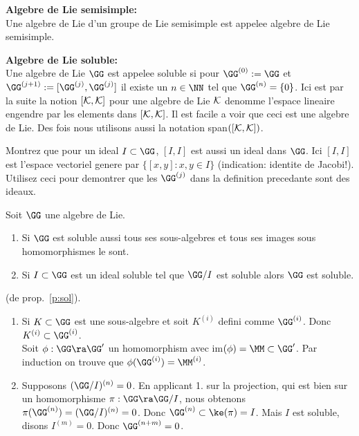 \begin{ddd}{\bf Algebre de Lie  semisimple:}\\
Une algebre de Lie d'un groupe de Lie  semisimple est appelee algebre de Lie  semisimple.
\end{ddd}
\begin{ddd}{\bf Algebre de Lie soluble:}\\
Une algebre de Lie $\GG$ est appelee soluble si pour $\GG^{(0)} :=\GG$ et $\GG^{(j+1)} :=[\GG^{(j)},\GG^{(j)}]$
il existe un $n\in \NN$ tel que $\GG^{(n)} = \{0\}$.
Ici est par la suite la notion $[{\cal K},{\cal K}]$ pour une algebre de Lie $\cal K$ denomme l'espace lineaire 
engendre par les elements dans  $[{\cal K},{\cal K}]$. Il est facile a voir que ceci est une algebre de Lie.
Des fois nous utilisons aussi la notation span$\left([{\cal K},{\cal K}]\right)$.
\end{ddd}
\begin{eee}
Montrez que pour un ideal $I\subset \GG$, $[I,I]$ est aussi un ideal dans $\GG$. Ici  $[I,I]$ est 
l'espace vectoriel genere par $\{ [x,y] : x, y \in I\}$ (indication: identite de 
Jacobi!). Utilisez ceci pour demontrer 
que les $\GG^{(j)}$ dans la definition precedante sont des ideaux.
\end{eee}
\begin{ppp} Soit $\GG$ une algebre de Lie. \label{p:sol}
\begin{enumerate}
\item Si $\GG$ est soluble aussi tous ses sous-algebres et tous ses images sous homomorphismes le sont.
\item Si $I\subset \GG$ est un ideal soluble tel que $\GG/I$ est soluble alors $\GG$ est soluble.
\end{enumerate}
\end{ppp}
\begin{prv} (de prop.~\ref{p:sol}).
\begin{enumerate}
\item Si $ K\subset \GG$ est une sous-algebre et soit $ K^{(i)}$ defini comme $\GG^{(i)}$.
Donc $ K^{(i)} \subset \GG^{(i)}$.\\ Soit $\phi : \GG \ra \GG'$ un 
homomorphism avec im$(\phi) = \MM\subset \GG'$. Par induction on trouve que $\phi(\GG^{(i)}) = \MM^{(i)}$.
\item Supposons $(\GG/I)^{(n)} =0$. En applicant 1. sur la projection, qui est bien sur un homomorphisme
$\pi : \GG \ra \GG/I$, nous obtenons $\pi(\GG^{(n)}) = (\GG/I)^{(n)} =0$. Donc $\GG^{(n)}\subset \ke(\pi) =I$.
Mais $I$ est soluble, disons $I^{(m)} = 0$. Donc $\GG^{(n+m)}=0$. 
\end{enumerate}
\end{prv}

